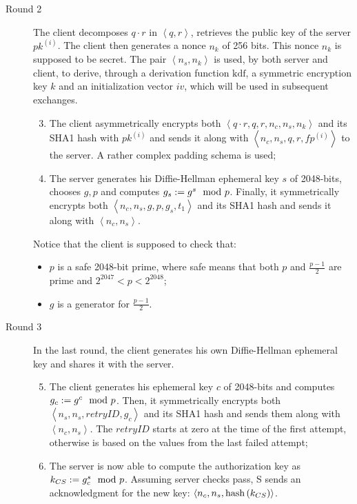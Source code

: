 \begin{description}
    \item[Round 2] The client decomposes $q\cdot r$ in $\left<q, r\right>$, retrieves the public key of the server $pk^{\left(i\right)}$. The client then generates a nonce $n_k$ of 256 bits. This nonce $n_k$ is supposed to be secret. The pair $\left<n_s, n_k\right>$ is used, by both server and client, to derive, through a derivation function $\mbox{kdf}$, a symmetric encryption key $k$ and an initialization vector $iv$, which will be used in subsequent exchanges.
    \begin{enumerate}
        \setcounter{enumi}{2}
        \item{The client asymmetrically encrypts both $\left<q\cdot r, q, r, n_c, n_s, n_k\right>$ and its SHA1 hash with $pk^{(i)}$ and sends it along with $\left<n_c, n_s, q, r, fp^{(i)}\right>$ to the server. A rather complex padding schema is used;}
        \item{The server generates his Diffie-Hellman ephemeral key $s$ of 2048-bits, chooses $g, p$ and computes $g_s:= g^s \mod{p}$. Finally, it symmetrically encrypts both $\left<n_c, n_s, g, p, g_s, t_1\right>$ and its SHA1 hash and sends it along with $\left<n_c, n_s\right>$.}
    \end{enumerate}

    Notice that the client is supposed to check that:
    \begin{itemize}
        \label{item:DH-clients-checks}
        \item{$p$ is a safe 2048-bit prime, where safe means that both $p$ and $\frac{p-1}{2}$ are prime and $2^{2047} < p < 2^{2048}$;}
        \item{$g$ is a generator for $\frac{p-1}{2}$.}
    \end{itemize}

    \item[Round 3] In the last round, the client generates his own Diffie-Hellman ephemeral key and shares it with the server.
    \begin{enumerate}
        \setcounter{enumi}{4}
        \item{The client generates his ephemeral key $c$ of 2048-bits and computes $g_c:= g^c \mod{p}$. Then, it symmetrically encrypts both $\left<n_s, n_s, retryID, g_c\right>$ and its SHA1 hash and sends them along with $\left<n_c, n_s\right>$. The $retryID$ starts at zero at the time of the first attempt, otherwise is based on the values from the last failed attempt;}
        \item{The server is now able to compute the authorization key as $k_{CS}:= g_c^s \mod{p}$. Assuming server checks pass, S sends an acknowledgment for the new key: $\left<n_c, n_s, \mbox{hash}\left(k_{CS}\right)\right>$.}
    \end{enumerate}

\end{description}

